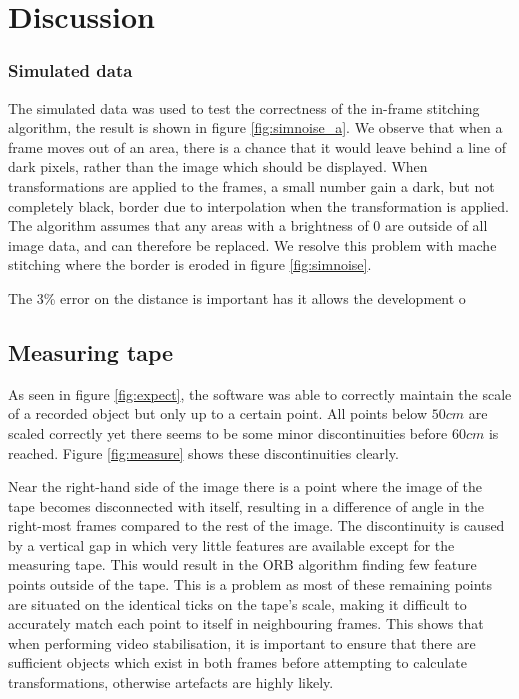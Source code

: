 \section{Discussion}
\subsubsection{Simulated data}
The simulated data was used to test the correctness of the in-frame stitching algorithm,
the result is shown in figure \ref{fig:simnoise_a}.
We observe that when a frame moves out of an area,
there is a chance that it would leave behind a line of dark pixels, rather than the image which should be displayed.
When transformations are applied to the frames, a small number gain a dark, but not completely black, border due to interpolation when the transformation is applied. 
The algorithm assumes that any areas with a brightness of 0 are outside of all image data, and can therefore be replaced.
We resolve this problem with mache stitching where the border is eroded in figure \ref{fig:simnoise}.

The 3\% error on the distance is important has it allows the development o

\subsection{Measuring tape}

As seen in figure \ref{fig:expect},
the software was able to correctly maintain the scale of a recorded object but only up to a certain point.
All points below $50 cm$ are scaled correctly
yet there seems to be some minor discontinuities before $60cm$ is reached.
Figure \ref{fig:measure} shows these discontinuities clearly.

Near the right-hand side of the image there is a point where the image of the tape becomes disconnected with itself,
resulting in a difference of angle in the right-most frames compared to the rest of the image.
The discontinuity is caused by a vertical gap in which very little features are available except for the measuring tape.
This would result in the ORB algorithm finding few feature points outside of the tape.
This is a problem as most of these remaining points are situated on the identical ticks on the tape's scale,
making it difficult to accurately match each point to itself in neighbouring frames.
This shows that when performing video stabilisation,
it is important to ensure that there are sufficient objects which exist in both frames before attempting to calculate transformations,  otherwise artefacts are highly likely.

